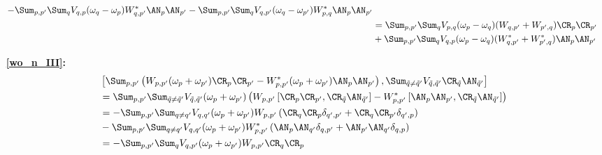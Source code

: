 \begin{appendix}
\begin{itemize}
\begin{align}
-\Sum_{ p, p^\prime}\Sum_{q}V_{q,p}(\omega_{q}-\omega_{p}) W_{ q, p^\prime}^* \AN_{p}\AN_{ p^\prime}
-\Sum_{ p, p^\prime}\Sum_{q}V_{q,p^\prime}(\omega_{q}-\omega_{p^\prime}) W_{ p, {q}}^* \AN_{ p}\AN_{p^\prime} \nonumber \\ \quad& 
=\Sum_{ p, p^\prime}\Sum_{q}V_{{p},q}(\omega_{p}-\omega_{q}) (W_{ q, p^\prime}+W_{ p^\prime, q})\CR_{ p}\CR_{p^\prime}\nonumber \\ \quad& 
+\Sum_{ p, p^\prime}\Sum_{q}V_{q,p}(\omega_{p}-\omega_{q}) (W_{ q, p^\prime}^*+W_{ p^\prime, {q}}^*) \AN_{p}\AN_{ p^\prime}
\end{align}
\item [\textbf{\ref{wo_n_III}:}]
\begin{align}
&\left[\Sum_{p,p^\prime}\left(W_{p,p^\prime}(\omega_p+\omega_{p^\prime})\CR_p\CR_{p^\prime}-W_{p,p^\prime}^*(\omega_p+\omega_{p^\prime})\AN_p\AN_{p^\prime}\right),\Sum_{\tilde q\neq \tilde q^\prime}V_{\tilde q,\tilde q^\prime}\CR_{\tilde q}\AN_{\tilde q^\prime}\right]\nonumber \\ \quad& 
=\Sum_{p,p^\prime}\Sum_{\tilde q\neq \tilde q^\prime}V_{\tilde q,\tilde q^\prime}(\omega_p+\omega_{p^\prime})\left(W_{p,p^\prime}\left[\CR_p\CR_{p^\prime},\CR_{\tilde q}\AN_{\tilde q^\prime}\right]-W_{p,p^\prime}^*\left[\AN_p\AN_{p^\prime},\CR_{\tilde q}\AN_{\tilde q^\prime}\right]\right)\nonumber \\ \quad& 
=-\Sum_{p,p^\prime}\Sum_{ q\neq  q^\prime}V_{ q, q^\prime}(\omega_p+\omega_{p^\prime})W_{p,p^\prime}\left(\CR_q\CR_p\delta_{q^\prime,p^\prime}+\CR_q\CR_{p^\prime}\delta_{q^\prime,p}\right)\nonumber \\ \quad& 
-\Sum_{p,p^\prime}\Sum_{ q\neq  q^\prime}V_{ q, q^\prime}(\omega_p+\omega_{p^\prime})W_{p,p^\prime}^*\left(\AN_p\AN_{q^\prime}\delta_{q,p^\prime}+\AN_{p^\prime}\AN_{q^\prime}\delta_{q,p}\right)\nonumber \\ \quad& 
=-\Sum_{p,p^\prime}\Sum_{q}V_{ q, p^\prime}(\omega_p+\omega_{p^\prime})W_{p,p^\prime}\CR_q\CR_p

\end{align}
\end{itemize}
\end{appendix}
